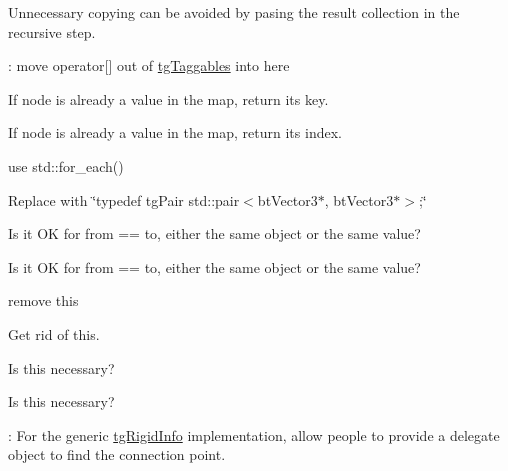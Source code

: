 \begin{DoxyRefList}
Unnecessary copying can be avoided by pasing the result collection in the recursive step.  
\item[\label{todo__todo000081}%
\hypertarget{todo__todo000081}{}%
Class \hyperlink{classtg_nodes}{tg\-Nodes} ]\-: move operator\mbox{[}\mbox{]} out of \hyperlink{classtg_taggables}{tg\-Taggables} into here  
\item[\label{todo__todo000083}%
\hypertarget{todo__todo000083}{}%
Member \hyperlink{classtg_nodes_aa63a138ca633becefe3bc6f64bc93520}{tg\-Nodes\-:\-:add\-Node} (const bt\-Vector3 \&node)]If node is already a value in the map, return its key.  
\item[\label{todo__todo000084}%
\hypertarget{todo__todo000084}{}%
Member \hyperlink{classtg_nodes_a9f28fa971610f4ee16264de703a74386}{tg\-Nodes\-:\-:add\-Node} (double x, double y, double z)]If node is already a value in the map, return its index.  
\item[\label{todo__todo000085}%
\hypertarget{todo__todo000085}{}%
Member \hyperlink{classtg_nodes_a9375dc4de8bcf20b49efae0a26e4f3af}{tg\-Nodes\-:\-:move} (const bt\-Vector3 \&offset)]use std\-::for\-\_\-each()  
\item[\label{todo__todo000087}%
\hypertarget{todo__todo000087}{}%
Class \hyperlink{classtg_pair}{tg\-Pair} ]Replace with \char`\"{}typedef tg\-Pair std\-::pair$<$bt\-Vector3$\ast$, bt\-Vector3$\ast$$>$;\char`\"{}  
\item[\label{todo__todo000089}%
\hypertarget{todo__todo000089}{}%
Member \hyperlink{classtg_pair_abc00b76d5026561c5cf8025cfe77520f}{tg\-Pair\-:\-:tg\-Pair} (bt\-Vector3 from, bt\-Vector3 to)]Is it O\-K for from == to, either the same object or the same value? 

Is it O\-K for from == to, either the same object or the same value?  
\item[\label{todo__todo000049}%
\hypertarget{todo__todo000049}{}%
Member \hyperlink{structtg_r_b_string_1_1_config_a599e7c66d595cbb500ad71722660d092}{tg\-R\-B\-String\-:\-:Config\-:\-:Config} ()]remove this  
\item[\label{todo__todo000050}%
\hypertarget{todo__todo000050}{}%
Member \hyperlink{classtg_r_b_string_a57298f001da09ec54a717033713a788b}{tg\-R\-B\-String\-:\-:setup} (\hyperlink{classtg_world}{tg\-World} \&world)]Get rid of this.  
\item[\label{todo__todo000096}%
\hypertarget{todo__todo000096}{}%
Member \hyperlink{classtg_rigid_info_af52e7743e7fb7ed3530cd101e464c242}{tg\-Rigid\-Info\-:\-:get\-Compound} ()=0]Is this necessary?  
\item[\label{todo__todo000097}%
\hypertarget{todo__todo000097}{}%
Member \hyperlink{classtg_rigid_info_a87335e33b2c650447dcf644bd85e6ace}{tg\-Rigid\-Info\-:\-:get\-Compound} () const =0]Is this necessary?  
\item[\label{todo__todo000094}%
\hypertarget{todo__todo000094}{}%
Member \hyperlink{classtg_rigid_info_a347721597db231b7eefc5b01a59346cc}{tg\-Rigid\-Info\-:\-:get\-Connection\-Point} (const bt\-Vector3 \&reference\-Point, const bt\-Vector3 \&destination\-Point) const =0]\-: For the generic \hyperlink{classtg_rigid_info}{tg\-Rigid\-Info} implementation, allow people to provide a delegate object to find the connection point. 


\end{DoxyRefList}
